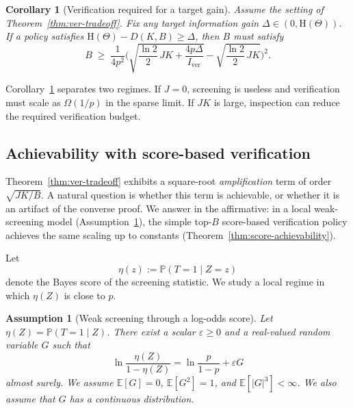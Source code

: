 \documentclass[twocolumn]{scholar7}
\newtheorem{corollary}[theorem]{Corollary}
\newtheorem{assumption}[theorem]{Assumption}
\newcommand{\E}{\mathbb{E}}
\newcommand{\Prob}{\mathbb{P}}
\newcommand{\Hh}{\mathrm{H}}
\newcommand{\abs}[1]{\left|#1\right|}
\begin{document}
\begin{corollary}[Verification required for a target gain]
\label{cor:ver-budget}
Assume the setting of Theorem~\ref{thm:ver-tradeoff}.
Fix any target information gain $\Delta\in(0,\Hh(\Theta))$.
If a policy satisfies $\Hh(\Theta)-D(K,B)\ge \Delta$, then $B$ must satisfy
\begin{equation}
\label{eq:ver-budget}
B \;\ge\;
\frac{1}{4p^2}
\Bigg(
\sqrt{\frac{\ln 2}{2}\,J K + \frac{4p\Delta}{I_{\mathrm{ver}}}}
-
\sqrt{\frac{\ln 2}{2}\,J K}
\Bigg)^2.
\end{equation}
\end{corollary}

Corollary~\ref{cor:ver-budget} separates two regimes.
If $J=0$, screening is useless and verification must scale as $\Omega(1/p)$ in the sparse limit.
If $J K$ is large, inspection can reduce the required verification budget.

\subsection{Achievability with score-based verification}
\label{subsec:achievability}

Theorem~\ref{thm:ver-tradeoff} exhibits a square-root \emph{amplification} term of order $\sqrt{J K/B}$.
A natural question is whether this term is achievable, or whether it is an artifact of the converse proof.
We answer in the affirmative: in a local weak-screening model (Assumption~\ref{asmp:weak-screening}), the simple top-$B$ score-based verification policy achieves the same scaling up to constants (Theorem~\ref{thm:score-achievability}).

Let
\[
\eta(z):=\Prob(T=1\mid Z=z)
\]
denote the Bayes score of the screening statistic.
We study a local regime in which $\eta(Z)$ is close to $p$.

\begin{assumption}[Weak screening through a log-odds score]
\label{asmp:weak-screening}
Let $\eta(Z)=\Prob(T=1\mid Z)$.
There exist a scalar $\varepsilon\ge 0$ and a real-valued random variable $G$ such that
\begin{equation}
\label{eq:logit-local}
\ln\frac{\eta(Z)}{1-\eta(Z)}
=
\ln\frac{p}{1-p}+\varepsilon G
\end{equation}
almost surely.
We assume $\E[G]=0$, $\E[G^2]=1$, and $\E[\abs{G}^3]<\infty$.
We also assume that $G$ has a continuous distribution.
\end{assumption}
\end{document}
